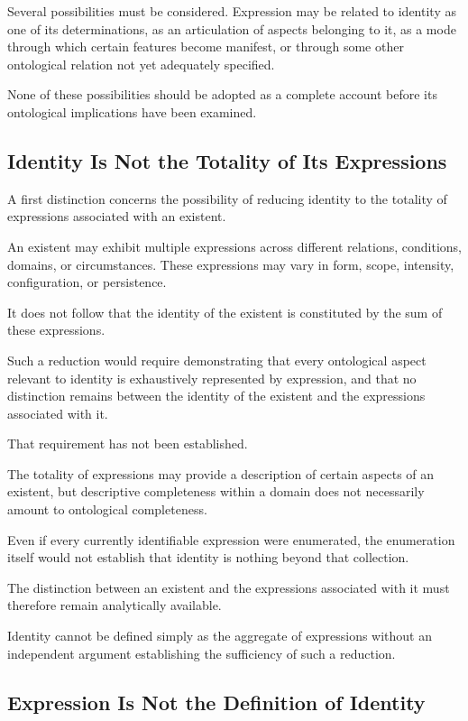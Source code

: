 Several possibilities must be considered. Expression
may be related to identity as one of its determinations,
as an articulation of aspects belonging to it, as a
mode through which certain features become manifest,
or through some other ontological relation not yet
adequately specified.

None of these possibilities should be adopted as a
complete account before its ontological implications
have been examined.

\subsection{Identity Is Not the Totality of Its Expressions}

A first distinction concerns the possibility of reducing
identity to the totality of expressions associated with
an existent.

An existent may exhibit multiple expressions across
different relations, conditions, domains, or circumstances.
These expressions may vary in form, scope, intensity,
configuration, or persistence.

It does not follow that the identity of the existent
is constituted by the sum of these expressions.

Such a reduction would require demonstrating that
every ontological aspect relevant to identity is
exhaustively represented by expression, and that no
distinction remains between the identity of the existent
and the expressions associated with it.

That requirement has not been established.

The totality of expressions may provide a description
of certain aspects of an existent, but descriptive
completeness within a domain does not necessarily
amount to ontological completeness.

Even if every currently identifiable expression were
enumerated, the enumeration itself would not establish
that identity is nothing beyond that collection.

The distinction between an existent and the expressions
associated with it must therefore remain analytically
available.

Identity cannot be defined simply as the aggregate
of expressions without an independent argument
establishing the sufficiency of such a reduction.

\subsection{Expression Is Not the Definition of Identity}


